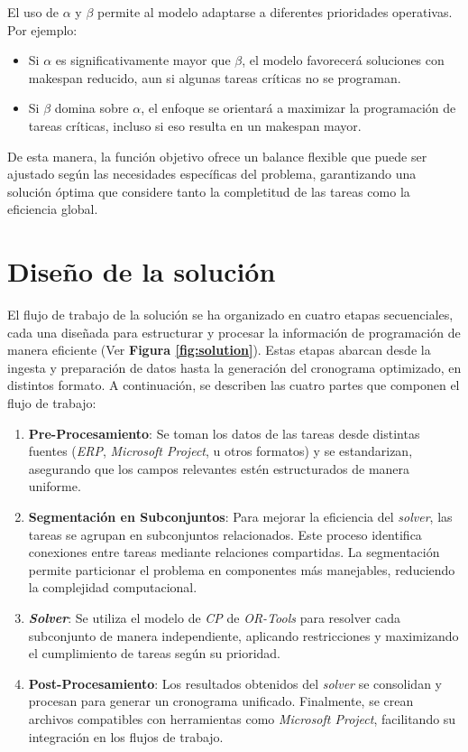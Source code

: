 \documentclass{article}
\begin{document}
El uso de \( \alpha \) y \( \beta \) permite al modelo adaptarse a diferentes prioridades operativas. Por ejemplo:

\begin{itemize}
    \item Si \( \alpha \) es significativamente mayor que \( \beta \), el modelo favorecerá soluciones con makespan reducido, aun si algunas tareas críticas no se programan.
    \item Si \( \beta \) domina sobre \( \alpha \), el enfoque se orientará a maximizar la programación de tareas críticas, incluso si eso resulta en un makespan mayor.
\end{itemize}

De esta manera, la función objetivo ofrece un balance flexible que puede ser ajustado según las necesidades específicas del problema, garantizando una solución óptima que considere tanto la completitud de las tareas como la eficiencia global.



\section{Diseño de la solución}

El flujo de trabajo de la solución se ha organizado en cuatro etapas secuenciales, cada una diseñada para estructurar y procesar la información de programación de manera eficiente (Ver \textbf{Figura \ref{fig:solution}}). Estas etapas abarcan desde la ingesta y preparación de datos hasta la generación del cronograma optimizado, en distintos formato. A continuación, se describen las cuatro partes que componen el flujo de trabajo:

\begin{enumerate}
    \item \textbf{Pre-Procesamiento}: Se toman los datos de las tareas desde distintas fuentes (\textit{ERP}, \textit{Microsoft Project}, u otros formatos) y se estandarizan, asegurando que los campos relevantes estén estructurados de manera uniforme.

    \item \textbf{Segmentación en Subconjuntos}: Para mejorar la eficiencia del \textit{solver}, las tareas se agrupan en subconjuntos relacionados. Este proceso identifica conexiones entre tareas mediante relaciones compartidas. La segmentación permite particionar el problema en componentes más manejables, reduciendo la complejidad computacional.

    \item \textbf{\textit{Solver}}: Se utiliza el modelo de \textit{CP} de \textit{OR-Tools} para resolver cada subconjunto de manera independiente, aplicando restricciones y maximizando el cumplimiento de tareas según su prioridad.

    \item \textbf{Post-Procesamiento}: Los resultados obtenidos del \textit{solver} se consolidan y procesan para generar un cronograma unificado. Finalmente, se crean archivos compatibles con herramientas como \textit{Microsoft Project}, facilitando su integración en los flujos de trabajo.
\end{enumerate}
\end{document}
